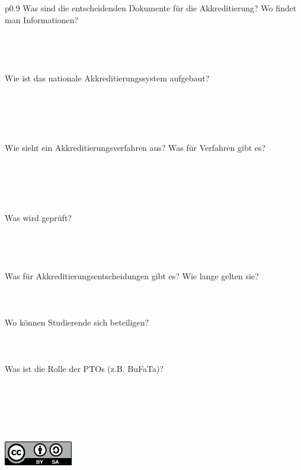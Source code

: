 \documentclass{scrartcl}
\begin{document}
\begin{tabular}{p{0.9\textwidth}}
Was sind die entscheidenden Dokumente für die Akkreditierung? Wo findet man Informationen? \\
\\
\hline\\
\hline\\
\hline\\

Wie ist das nationale Akkreditierungssystem aufgebaut?\\
\\
\\
\\
\\
\\
Wie sieht ein Akkreditierungsverfahren aus? Was für Verfahren gibt es?\\
\\
\\
\\
\\
\\
Was wird geprüft?\\
\\
\hline\\
\hline\\
\hline\\
Was für Akkreditierungsentscheidungen gibt es? Wie lange gelten sie?\\
\\
\hline\\
\hline\\
Wo können Studierende sich beteiligen?\\
\\
\hline\\
\hline\\
Was ist die Rolle der PTOs (z.B. BuFaTa)?\\
\\
\hline\\
\hline\\
\hline\\

\end{tabular}\\
\hspace*{.8\linewidth}\includegraphics[width=3cm]{CC-BY-SA.png}
\end{document}
